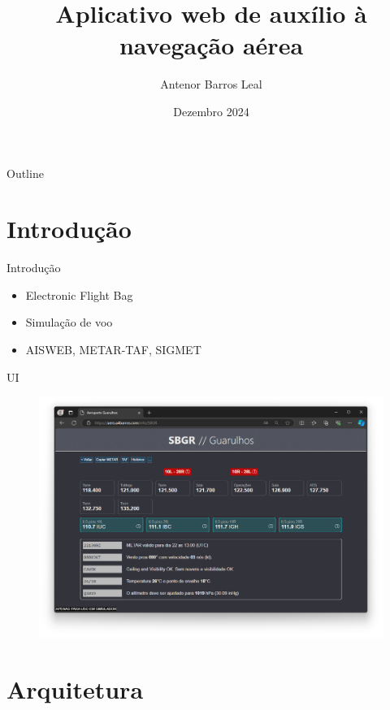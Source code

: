 \documentclass{beamer}
\title{Aplicativo web de auxílio à navegação aérea}
\author{Antenor Barros Leal}
\institute{Departamento de Informática \\ PUC-Rio}
\date{Dezembro 2024}
\begin{document}
\begin{frame}
    \titlepage
\end{frame}

\begin{frame}{Outline}
    \tableofcontents
\end{frame}

\section{Introdução}

\begin{frame}{Introdução}
    \begin{itemize}
        \item Electronic Flight Bag
        \item Simulação de voo
        \item AISWEB, METAR-TAF, SIGMET
    \end{itemize}
\end{frame}

\begin{frame}{UI}
    \begin{figure}[ht]
        \begin{center}
        \includegraphics[width=0.8\linewidth]{img/UI.png}
        \label{fig:UI}
        \end{center}
    \end{figure}
\end{frame}


\section{Arquitetura}
\end{document}
